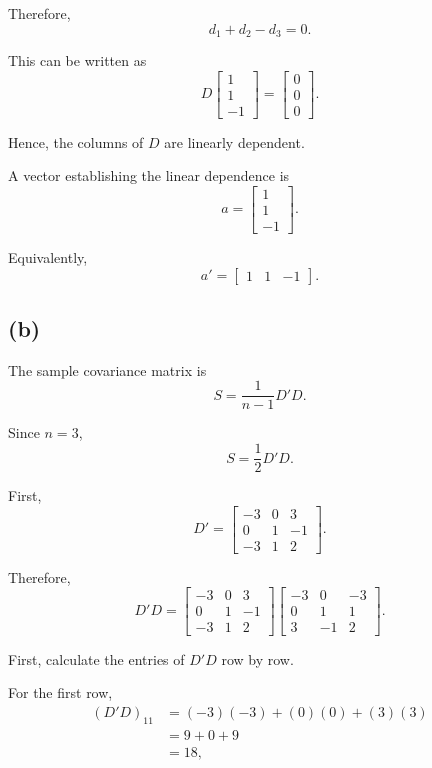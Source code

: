 \documentclass[12pt]{article}
\begin{document}
	Therefore,
	\[
	d_1+d_2-d_3=0.
	\]
	
	This can be written as
	\[
	D
	\begin{bmatrix}
		1\\1\\-1
	\end{bmatrix}
	=
	\begin{bmatrix}
		0\\0\\0
	\end{bmatrix}.
	\]
	
	Hence, the columns of \(D\) are linearly dependent.
	
	A vector establishing the linear dependence is
	\[
	\boxed{
		a=
		\begin{bmatrix}
			1\\1\\-1
	\end{bmatrix}}.
	\]
	
	Equivalently,
	\[
	\boxed{
		a'=
		\begin{bmatrix}
			1&1&-1
	\end{bmatrix}}.
	\]
	
	\subsection*{(b)}
	
	The sample covariance matrix is
	\[
	S
	=
	\frac{1}{n-1}D'D.
	\]
	
	Since \(n=3\),
	\[
	S=\frac12D'D.
	\]
	
	First,
	\[
	D'
	=
	\begin{bmatrix}
		-3&0&3\\
		0&1&-1\\
		-3&1&2
	\end{bmatrix}.
	\]
	
	Therefore,
	\[
	D'D
	=
	\begin{bmatrix}
		-3&0&3\\
		0&1&-1\\
		-3&1&2
	\end{bmatrix}
	\begin{bmatrix}
		-3&0&-3\\
		0&1&1\\
		3&-1&2
	\end{bmatrix}.
	\]
	
	First, calculate the entries of \(D'D\) row by row.
	
	For the first row,
	\[
	\begin{aligned}
		(D'D)_{11}
		&=(-3)(-3)+(0)(0)+(3)(3)\\
		&=9+0+9\\
		&=18,
	\end{aligned}
	\]
	
\end{document}
